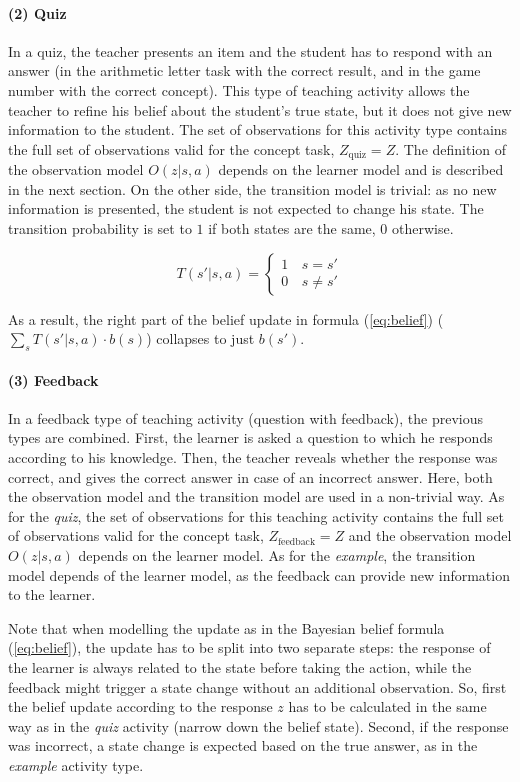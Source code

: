 \paragraph{(2) Quiz} In a quiz, the teacher presents an item and the student has to respond with an answer (in the arithmetic letter task with the correct result, and in the game number with the correct concept). This type of teaching activity allows the teacher to refine his belief about the student's true state, but it does not give new information to the student. 
The set of observations for this activity type contains the full set of observations valid for the concept task, $Z_{\text{quiz}} = Z$.
The definition of the observation model $O(z|s,a)$ depends on the learner model and is described in the next section. 
On the other side, the transition model is trivial: as no new information is presented, the student is not expected to change his state. The transition probability is set to $1$ if both states are the same, $0$ otherwise.

\begin{equation}
    T(s'|s,a) = \begin{cases}
        1 & \, s  = s' \\
        0 & \, s \neq s'
    \end{cases}
\end{equation}

As a result, the right part of the belief update in formula (\ref{eq:belief}) ($\sum_s{T(s'|s,a) \cdot b(s)}$) collapses to just $b(s')$.

\paragraph{(3) Feedback} In a feedback type of teaching activity (question with feedback), the previous types are combined. First, the learner is asked a question to which he responds according to his knowledge. Then, the teacher reveals whether the response was correct, and gives the correct answer in case of an incorrect answer. 
Here, both the observation model and the transition model are used in a non-trivial way. As for the \textit{quiz}, the set of observations for this teaching activity contains the full set of observations valid for the concept task, $Z_{\text{feedback}} = Z$ and the observation model $O(z|s,a)$ depends on the learner model. As for the \textit{example}, the transition model depends of the learner model, as the feedback can provide new information to the learner.

Note that when modelling the update as in the Bayesian belief formula (\ref{eq:belief}), the update has to be split into two separate steps: the response of the learner is always related to the state before taking the action, while the feedback might trigger a state change without an additional observation. So, first the belief update according to the response $z$ has to be calculated in the same way as in the \textit{quiz} activity (narrow down the belief state). Second, if the response was incorrect, a state change is expected based on the true answer, as in the \textit{example} activity type.

